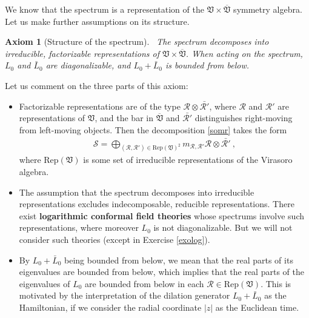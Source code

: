 \documentclass[12pt, a4paper, notitlepage, twoside]{report}
\numberwithin{equation}{section}
\theoremstyle{break}
\newtheorem{hyp}{Axiom}[chapter]
\begin{document}
We know that the spectrum is a representation of the 
$\mathfrak{V}\times \overline{\mathfrak{V}}$ symmetry algebra.
Let us make further assumptions on its structure.

\begin{hyp}[Structure of the spectrum]
 ~\label{ax:sots}
 The spectrum decomposes into irreducible, factorizable representations of $\mathfrak{V}\times \overline{\mathfrak{V}}$. When acting on the spectrum, $L_0$ and $\bar L_0$ are diagonalizable, and $L_0+\bar L_0$ is bounded from below.
\end{hyp} 
\noindent
Let us comment on the three parts of this axiom:
\begin{itemize}
 \item 
 Factorizable representations are of the type $\mathcal{R}\otimes \bar{\mathcal{R}'}$, where $\mathcal{R}$ and $\mathcal{R}'$ are representations of $\mathfrak{V}$, and the bar in $\overline{\mathfrak{V}}$ and $\bar{\mathcal{R}'}$ distinguishes right-moving from left-moving objects. 
Then the decomposition \eqref{somr} takes the form
\begin{align}
 \boxed{\mathcal{S} = \bigoplus_{(\mathcal{R},\mathcal{R}')\in \text{Rep}(\mathfrak{V})^2} m_{\mathcal{R},\mathcal{R}'} \mathcal{R}\otimes \bar{\mathcal{R}'}}\ ,
\label{sorr}
\end{align}
where $\text{Rep}(\mathfrak{V})$ is some set of irreducible representations of the Virasoro algebra.
\item
The assumption that the spectrum decomposes into irreducible representations excludes indecomposable, reducible representations. 
There exist \textbf{\boldmath logarithmic conformal field theories} whose spectrums involve such representations, where moreover $L_0$ is not diagonalizable. 
But we will not consider such theories (except in Exercise \ref{exolog}).
\item 
By $L_0+\bar L_0$ being bounded from below, we mean that the real parts of its eigenvalues are bounded from below, which implies that the real parts of the eigenvalues of $L_0$ are bounded from below in each $\mathcal{R}\in\text{Rep}(\mathfrak{V})$. 
This is motivated by the interpretation of the dilation generator $L_0+\bar L_0$ as the Hamiltonian, if we consider the radial coordinate $|z|$ as the Euclidean time. 
\end{itemize}
\end{document}
